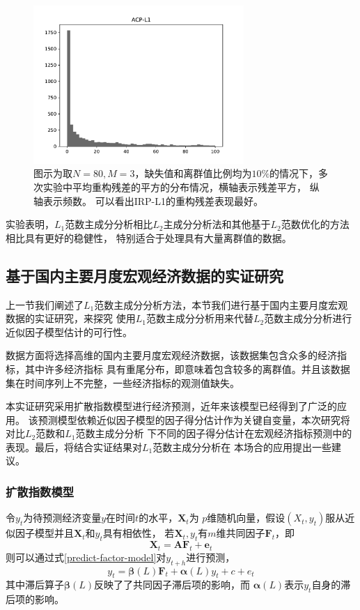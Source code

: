 \begin{figure}[H]
\begin{minipage}[t]{0.48\textwidth}
    \includegraphics[width=8cm]{pics/lab1/acp-l1.pdf}
    \end{minipage}
    \caption{\small 图示为取$N = 80, M=3$，缺失值和离群值比例均为$10\%$的情况下，多次实验中平均重构残差的平方的分布情况，横轴表示残差平方，
    纵轴表示频数。
    可以看出IRP-L1的重构残差表现最好。}
\end{figure}

实验表明，$L_1$范数主成分分析相比$L_2$主成分分析法和其他基于$L_2$范数优化的方法相比具有更好的稳健性，
特别适合于处理具有大量离群值的数据。

\subsection{基于国内主要月度宏观经济数据的实证研究}
上一节我们阐述了$L_1$范数主成分分析方法，本节我们进行基于国内主要月度宏观数据的实证研究，来探究
使用$L_1$范数主成分分析用来代替$L_2$范数主成分分析进行近似因子模型估计的可行性。

数据方面将选择高维的国内主要月度宏观经济数据，该数据集包含众多的经济指标，其中许多经济指标
具有重尾分布，即意味着包含较多的离群值。并且该数据集在时间序列上不完整，一些经济指标的观测值缺失。

本实证研究采用扩散指数模型进行经济预测\cite{stock2002macroeconomic}，近年来该模型已经得到了广泛的应用。
该预测模型依赖近似因子模型的因子得分估计作为关键自变量，本次研究将对比$L_2$范数和$L_1$范数主成分分析
下不同的因子得分估计在宏观经济指标预测中的表现。最后，将结合实证结果对$L_1$范数主成分分析在
本场合的应用提出一些建议。

\subsubsection{扩散指数模型}
令$y_t$为待预测经济变量$y$在时间$t$的水平，$\bm{X}_t$为
$p$维随机向量，假设$(X_t,y_t)$服从近似因子模型并且$\bm{X}_t$和$y_t$具有相依性，
若$\bm{X}_t, y_t$有$m$维共同因子$\bm{F}_t$，即
\begin{equation}
    \bm{X}_t = \bm{A}\bm{F}_t + \bm{e}_t
\end{equation}
则可以通过式\eqref{predict-factor-model}对$y_{t+h}$进行预测，
\begin{equation}\label{predict-factor-model}
    y_t = \bm{\beta}(L)\bm{F}_t + \bm{\alpha}(L)y_t + c + e_t
\end{equation}
其中滞后算子$\bm{\beta}(L)$反映了了共同因子滞后项的影响，而
$\bm{\alpha}(L)$表示$y_t$自身的滞后项的影响。


